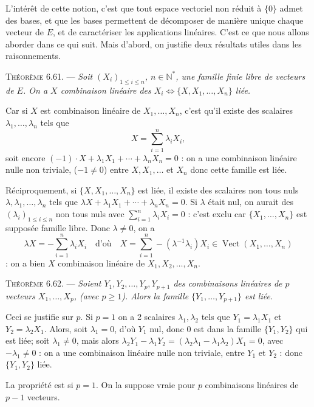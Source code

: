 L'intérêt de cette notion, c'est que tout espace vectoriel non réduit à $\{0\}$ admet des bases, et que les bases permettent de décomposer de manière unique chaque vecteur de $E$, et de caractériser les applications linéaires. C'est ce que nous allons aborder dans ce qui suit. Mais d'abord, on justifie deux résultats utiles dans les raisonnements.

\medskip\noindent\textsc{Théorème 6.61.} --- \emph{Soit $(X_i)_{1\le i\le n}$, $n\in\mathbb N^*$, une famille finie libre de vecteurs de $E$. On a $X$ combinaison linéaire des $X_i\Longleftrightarrow\{X,X_1,\ldots,X_n\}$ liée.}

Car si $X$ est combinaison linéaire de $X_1,\ldots,X_n$, c'est qu'il existe des scalaires $\lambda_1,\ldots,\lambda_n$ tels que
\[
X=\sum_{i=1}^n\lambda_iX_i,
\]
soit encore $(-1)\cdot X+\lambda_1X_1+\cdots+\lambda_nX_n=0$ : on a une combinaison linéaire nulle non triviale, ($-1\ne0$) entre $X,X_1,\ldots$ et $X_n$ donc cette famille est liée.

Réciproquement, si $\{X,X_1,\ldots,X_n\}$ est liée, il existe des scalaires non tous nuls $\lambda,\lambda_1,\ldots,\lambda_n$ tels que $\lambda X+\lambda_1X_1+\cdots+\lambda_nX_n=0$. Si $\lambda$ était nul, on aurait des $(\lambda_i)_{1\le i\le n}$ non tous nuls avec $\sum_{i=1}^n\lambda_iX_i=0$ : c'est exclu car $\{X_1,\ldots,X_n\}$ est supposée famille libre. Donc $\lambda\ne0$, on a
\[
\lambda X=-\sum_{i=1}^n\lambda_iX_i\quad\text{d'où}\quad X=\sum_{i=1}^n-(\lambda^{-1}\lambda_i)X_i\in\operatorname{Vect}(X_1,\ldots,X_n)
\]
: on a bien $X$ combinaison linéaire de $X_1,X_2,\ldots,X_n$. \bookend

\medskip\noindent\textsc{Théorème 6.62.} --- \emph{Soient $Y_1,Y_2,\ldots,Y_p,Y_{p+1}$ des combinaisons linéaires de $p$ vecteurs $X_1,\ldots,X_p$, (avec $p\ge1$). Alors la famille $\{Y_1,\ldots,Y_{p+1}\}$ est liée.}

Ceci se justifie  sur $p$. Si $p=1$ on a 2 scalaires $\lambda_1,\lambda_2$ tels que $Y_1=\lambda_1X_1$ et $Y_2=\lambda_2X_1$. Alors, soit $\lambda_1=0$, d'où $Y_1$ nul, donc 0 est dans la famille $\{Y_1,Y_2\}$ qui est liée; soit $\lambda_1\ne0$, mais alors $\lambda_2Y_1-\lambda_1Y_2=(\lambda_2\lambda_1-\lambda_1\lambda_2)X_1=0$, avec $-\lambda_1\ne0$ : on a une combinaison linéaire nulle non triviale, entre $Y_1$ et $Y_2$ : donc $\{Y_1,Y_2\}$ liée.

La propriété est  si $p=1$. On la suppose vraie pour $p$ combinaisons linéaires de $p-1$ vecteurs.

